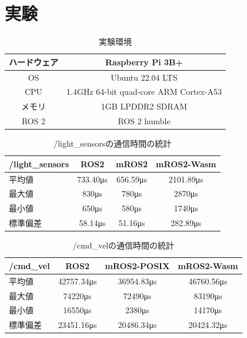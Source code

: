 \chapter{実験}
\label{chap:evaluation}
\begin{table}[ht]
  \caption{実験環境}
  \label{tab:experiment}
  \centering
  \begin{tabular}{|c|c|} \hline
    ハードウェア & Raspberry Pi 3B+ \\ \hline
    OS & Ubuntu 22.04 LTS \\ \hline
    CPU & 1.4GHz 64-bit quad-core ARM Cortex-A53 \\ \hline
    メモリ & 1GB LPDDR2 SDRAM \\ \hline
    ROS 2 & ROS 2 humble \\ \hline
  \end{tabular}
\end{table}

\begin{table}[ht]
  \centering
  \begin{tabular}{|l|c|c|c|}
  \hline
  /light\_sensors & ROS2 & mROS2 & mROS2-Wasm \\ \hline
  平均値 & 733.40μs & 656.59μs & 2101.89μs \\ \hline
  最大値 & 830μs & 780μs & 2870μs \\ \hline
  最小値 & 650μs & 580μs & 1740μs \\ \hline
  標準偏差 & 58.14μs & 51.16μs & 282.89μs \\ \hline
  \end{tabular}
  \caption{/light\_sensorsの通信時間の統計}
  \label{tab:sensor_stats}
\end{table}

\begin{table}[ht]
  \centering
  \begin{tabular}{|l|c|c|c|}
  \hline
  /cmd\_vel & ROS2 & mROS2-POSIX & mROS2-Wasm \\ \hline
  平均値 & 42757.34μs & 36954.83μs & 46760.56μs \\ \hline
  最大値 & 74220μs & 72490μs & 83190μs \\ \hline
  最小値 & 16550μs & 2380μs & 14170μs \\ \hline
  標準偏差 & 23451.16μs & 20486.34μs & 20424.32μs \\ \hline
  \end{tabular}
  \caption{/cmd\_velの通信時間の統計}
  \label{tab:sensor_stats}
\end{table}

